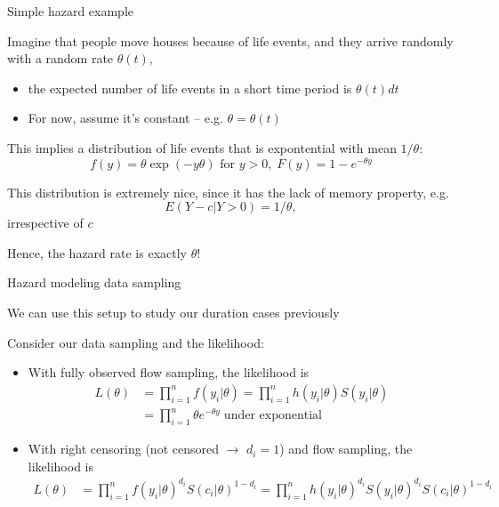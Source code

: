 \documentclass[notes,11pt, aspectratio=169]{beamer}
\newenvironment{wideitemize}{\itemize\addtolength{\itemsep}{10pt}}{\enditemize}
\begin{document}
\begin{frame}{Simple hazard example}
  \begin{wideitemize}
  \item Imagine that people move houses because of life events, and
    they arrive randomly with a random rate $\theta(t)$,
    \begin{itemize}
    \item the expected number of life events in a short time period is $\theta(t) dt$
    \item For now, assume it's constant -- e.g. $\theta = \theta(t)$
    \end{itemize}
  \item This implies a distribution of life events that is
    expontential with mean $1/\theta$:
    $$f(y) = \theta \exp(-y\theta) \text{ for } y > 0, \; F(y) = 1- e^{-\theta y}$$
  \item This distribution is extremely nice, since it has the lack of
    memory property, e.g.
    $$E(Y - c | Y > 0) = 1/\theta,$$
    irrespective of $c$
  \item Hence, the hazard rate is exactly $\theta$!
    
  \end{wideitemize}
\end{frame}

\begin{frame}{Hazard modeling data sampling}
  \begin{wideitemize}
  \item   We can use this setup to study our duration cases previously
  \item Consider our data sampling and the likelihood:
    \begin{itemize}
    \item With fully observed flow sampling, the likelihood is
      \begin{align*}
        L(\theta) &= \prod_{i=1}^{n} f(y_{i}|\theta) = \prod_{i=1}^{n} h(y_{i}|\theta) S(y_{i}|\theta)\\
        &= \prod_{i=1}^{n} \theta e^{-\theta y} \; \text{under exponential}
      \end{align*}
    \item With right censoring (not censored $\rightarrow$ $d_{i} = 1$) and flow sampling, the likelihood is
      \begin{align*}
        L(\theta) &= \prod_{i=1}^{n} f(y_{i}|\theta)^{d_{i}}S(c_{i}|\theta)^{1-d_{i}} = \prod_{i=1}^{n} h(y_{i}|\theta)^{d_{i}} S(y_{i}|\theta)^{d_{i}} S(c_{i}|\theta)^{1-d_{i}}\\
        \end{align*}
    \end{itemize}
  \end{wideitemize}
\end{frame}
\end{document}

